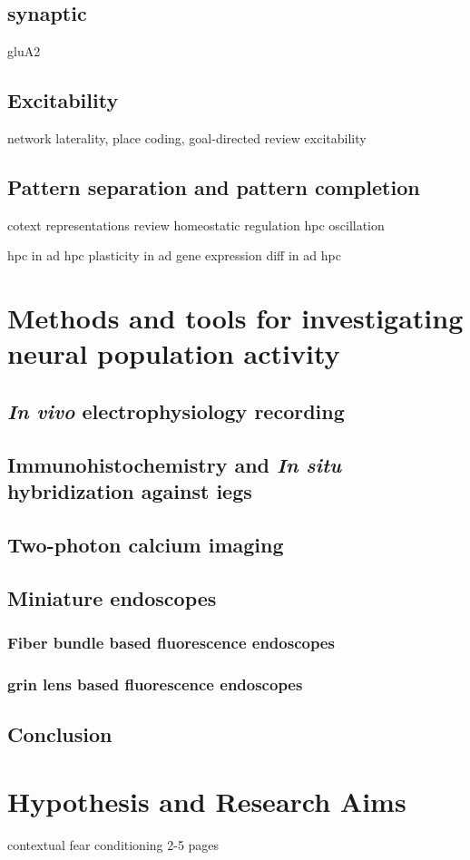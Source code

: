 \subsection{synaptic \label{ad.synaptic}}
gluA2
\subsection{Excitability}
    network laterality, place coding, goal-directed review\citep{kitanishi16}
    \citep{oh14} excitability
\subsection{Pattern separation and pattern completion}
    \citep{smith14} cotext representations review
    homeostatic regulation \citep{mizumori13}
    \citep{draguhn14} hpc oscillation


\citep{moodley14} hpc in \gls{ad}
\citep{mufson15} hpc plasticity in \gls{ad}
\citep{saura15} gene expression diff in \gls{ad} hpc

\section{Methods and tools for investigating neural population activity}
\subsection{\textit{In vivo} electrophysiology recording}
\subsection{Immunohistochemistry and \textit{In situ} hybridization against \glspl{ieg}}
\subsection{Two-photon calcium imaging}
\subsection{Miniature endoscopes}
\subsubsection{Fiber bundle based fluorescence endoscopes}
\subsubsection{\gls{grin} lens based fluorescence endoscopes}
\subsection{Conclusion}


\section{Hypothesis and Research Aims}
\citep{rozeske14} contextual fear conditioning
2-5 pages
